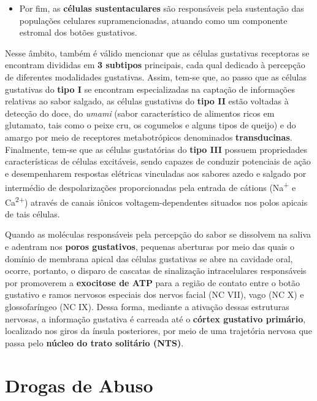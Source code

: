 \documentclass[
]{book}
\providecommand{\tightlist}{%
  \setlength{\itemsep}{0pt}\setlength{\parskip}{0pt}}
\theoremstyle{definition}
\theoremstyle{definition}
\theoremstyle{definition}
\theoremstyle{definition}
\theoremstyle{remark}
\begin{document}
\begin{itemize}
\tightlist
\item
  Por fim, as \textbf{células sustentaculares} são responsáveis pela sustentação das populações celulares supramencionadas, atuando como um componente estromal dos botões gustativos.
\end{itemize}

Nesse âmbito, também é válido mencionar que as células gustativas receptoras se encontram divididas em \textbf{3 subtipos} principais, cada qual dedicado à percepção de diferentes modalidades gustativas. Assim, tem-se que, ao passo que as células gustativas do \textbf{tipo I} se encontram especializadas na captação de informações relativas ao sabor salgado, as células gustativas do \textbf{tipo II} estão voltadas à detecção do doce, do \emph{umami} (sabor característico de alimentos ricos em glutamato, tais como o peixe cru, os cogumelos e alguns tipos de queijo) e do amargo por meio de receptores metabotrópicos denominados \textbf{transducinas}. Finalmente, tem-se que as células gustatórias do \textbf{tipo III} possuem propriedades características de células excitáveis, sendo capazes de conduzir potenciais de ação e desempenharem respostas elétricas vinculadas aos sabores azedo e salgado por intermédio de despolarizações proporcionadas pela entrada de cátions (Na\textsuperscript{+} e Ca\textsuperscript{2+}) através de canais iônicos voltagem-dependentes situados nos polos apicais de tais células.

Quando as moléculas responsáveis pela percepção do sabor se dissolvem na saliva e adentram nos \textbf{poros gustativos}, pequenas aberturas por meio das quais o domínio de membrana apical das células gustativas se abre na cavidade oral, ocorre, portanto, o disparo de cascatas de sinalização intracelulares responsáveis por promoverem a \textbf{exocitose de ATP} para a região de contato entre o botão gustativo e ramos nervosos especiais dos nervos facial (NC VII), vago (NC X) e glossofaríngeo (NC IX). Dessa forma, mediante a ativação dessas estruturas nervosas, a informação gustativa é carreada até o \textbf{córtex gustativo primário}, localizado nos giros da ínsula posteriores, por meio de uma trajetória nervosa que passa pelo \textbf{núcleo do trato solitário (NTS)}.

\hypertarget{drogas-de-abuso}{%
\chapter{Drogas de Abuso}\label{drogas-de-abuso}}
\end{document}
